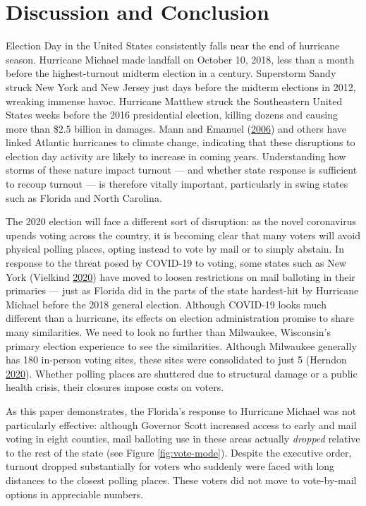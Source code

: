 \documentclass[
  12pt,
]{article}
\begin{document}
\hypertarget{discussion-and-conclusion}{%
\section*{Discussion and Conclusion}\label{discussion-and-conclusion}}

Election Day in the United States consistently falls near the end of hurricane season. Hurricane Michael made landfall on October 10, 2018, less than a month before the highest-turnout midterm election in a century. Superstorm Sandy struck New York and New Jersey just days before the midterm elections in 2012, wreaking immense havoc. Hurricane Matthew struck the Southeastern United States weeks before the 2016 presidential election, killing dozens and causing more than \$2.5 billion in damages. Mann and Emanuel (\protect\hyperlink{ref-Mann2006}{2006}) and others have linked Atlantic hurricanes to climate change, indicating that these disruptions to election day activity are likely to increase in coming years. Understanding how storms of these nature impact turnout --- and whether state response is sufficient to recoup turnout --- is therefore vitally important, particularly in swing states such as Florida and North Carolina.

The 2020 election will face a different sort of disruption: as the novel coronavirus upends voting across the country, it is becoming clear that many voters will avoid physical polling places, opting instead to vote by mail or to simply abstain. In response to the threat posed by COVID-19 to voting, some states such as New York (Vielkind \protect\hyperlink{ref-Vielkind2020}{2020}) have moved to loosen restrictions on mail balloting in their primaries --- just as Florida did in the parts of the state hardest-hit by Hurricane Michael before the 2018 general election. Although COVID-19 looks much different than a hurricane, its effects on election administration promise to share many similarities. We need to look no further than Milwaukee, Wisconsin's primary election experience to see the similarities. Although Milwaukee generally has 180 in-person voting sites, these sites were consolidated to just 5 (Herndon \protect\hyperlink{ref-Herndon2020}{2020}). Whether polling places are shuttered due to structural damage or a public health crisis, their closures impose costs on voters.

As this paper demonstrates, the Florida's response to Hurricane Michael was not particularly effective: although Governor Scott increased access to early and mail voting in eight counties, mail balloting use in these areas actually \emph{dropped} relative to the rest of the state (see Figure \ref{fig:vote-mode}). Despite the executive order, turnout dropped substantially for voters who suddenly were faced with long distances to the closest polling places. These voters did not move to vote-by-mail options in appreciable numbers.
\end{document}
